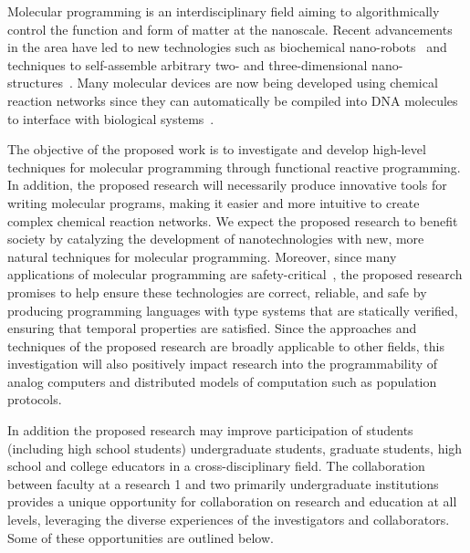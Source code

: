 

Molecular programming is an interdisciplinary field aiming to algorithmically control the function and form of matter at the nanoscale.
Recent advancements in the area have led to new technologies such as biochemical nano-robots~\cite{jDoBaCh12}  and techniques to self-assemble arbitrary two- and three-dimensional nano-structures~\cite{jRoth06,jDDLHGS09,jDMTVCS09,jKOSY12,benson2015dna,Juneaav0655}.
Many molecular devices are now being developed using chemical reaction networks since they can automatically be compiled into DNA molecules to interface with biological systems~\cite{cSoSeWi09,jLYCP12,jCard13,jCDSPCS13,jSPSWS17,cBSJDTW17}.

The objective of the proposed work is to investigate and develop high-level techniques for molecular programming through functional reactive programming.
In addition, the proposed research will necessarily produce innovative tools for writing molecular programs, making it easier and more intuitive to create complex chemical reaction networks.
We expect the proposed research to benefit society by catalyzing the development of nanotechnologies with new, more natural techniques for molecular programming.
Moreover, since many applications of molecular programming are safety-critical~\cite{jEKLLLM17,cLutz18}, the proposed research promises to help ensure these technologies are correct, reliable, and safe by producing programming languages with type systems that are statically verified, ensuring that temporal properties are satisfied.
Since the approaches and techniques of the proposed research are broadly applicable to other fields, this investigation will also positively impact research into the programmability of analog computers and distributed models of computation such as population protocols.

In addition the proposed research may improve participation of students (including high school students) undergraduate students, graduate students, high school and college educators in a cross-disciplinary field.
The collaboration between faculty at a research 1 and two primarily undergraduate institutions provides a unique opportunity for collaboration on research and education at all levels, leveraging the diverse experiences of the investigators and collaborators.
Some of these opportunities are outlined below.  

